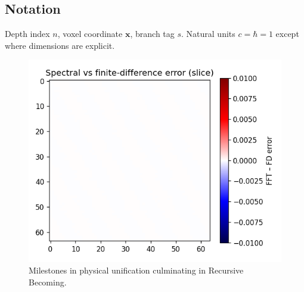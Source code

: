 \subsection{Notation}

Depth index $n$, voxel coordinate $\mathbf x$, branch tag $s$.
Natural units $c=\hbar=1$ except where dimensions are explicit.

\begin{figure}[t]
  \centering
\includegraphics[width=0.8\linewidth]{figs/intro_timeline.png}


  \caption{Milestones in physical unification culminating in Recursive Becoming.}
  \label{fig:intro-timeline}
\end{figure}

\clearpage
